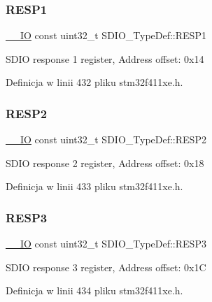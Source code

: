 \subsubsection{\texorpdfstring{R\+E\+S\+P1}{RESP1}}
{\footnotesize\ttfamily \hyperlink{core__sc300_8h_aec43007d9998a0a0e01faede4133d6be}{\+\_\+\+\_\+\+IO} const uint32\+\_\+t S\+D\+I\+O\+\_\+\+Type\+Def\+::\+R\+E\+S\+P1}

S\+D\+IO response 1 register, Address offset\+: 0x14 

Definicja w linii 432 pliku stm32f411xe.\+h.

\mbox{\label{struct_s_d_i_o___type_def_af06e60089c11f9402d69a56aa828edda}} 
\subsubsection{\texorpdfstring{R\+E\+S\+P2}{RESP2}}
{\footnotesize\ttfamily \hyperlink{core__sc300_8h_aec43007d9998a0a0e01faede4133d6be}{\+\_\+\+\_\+\+IO} const uint32\+\_\+t S\+D\+I\+O\+\_\+\+Type\+Def\+::\+R\+E\+S\+P2}

S\+D\+IO response 2 register, Address offset\+: 0x18 

Definicja w linii 433 pliku stm32f411xe.\+h.

\mbox{\label{struct_s_d_i_o___type_def_a51c8a77f72757a2c17d38b61ff13f356}} 
\subsubsection{\texorpdfstring{R\+E\+S\+P3}{RESP3}}
{\footnotesize\ttfamily \hyperlink{core__sc300_8h_aec43007d9998a0a0e01faede4133d6be}{\+\_\+\+\_\+\+IO} const uint32\+\_\+t S\+D\+I\+O\+\_\+\+Type\+Def\+::\+R\+E\+S\+P3}

S\+D\+IO response 3 register, Address offset\+: 0x1C 

Definicja w linii 434 pliku stm32f411xe.\+h.

\mbox{\label{struct_s_d_i_o___type_def_a2c4c03d0ead9405bf5b3b3224b36e639}} 

